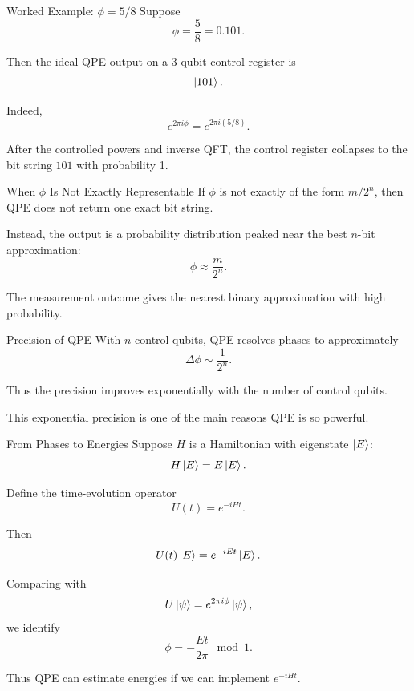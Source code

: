 \documentclass{beamer}
\begin{document}
\begin{frame}{Worked Example: \(\phi=5/8\)}
Suppose
\[
\phi = \frac{5}{8} = 0.101.
\]

Then the ideal QPE output on a 3-qubit control register is
\[
\ket{101}.
\]

Indeed,
\[
e^{2\pi i \phi} = e^{2\pi i (5/8)}.
\]

After the controlled powers and inverse QFT, the control register collapses to the bit string \(101\) with probability 1.
\end{frame}

\begin{frame}{When \(\phi\) Is Not Exactly Representable}
If \(\phi\) is not exactly of the form \(m/2^n\), then QPE does not return one exact bit string.

Instead, the output is a probability distribution peaked near the best \(n\)-bit approximation:
\[
\phi \approx \frac{m}{2^n}.
\]

The measurement outcome gives the nearest binary approximation with high probability.
\end{frame}

\begin{frame}{Precision of QPE}
With \(n\) control qubits, QPE resolves phases to approximately
\[
\Delta \phi \sim \frac{1}{2^n}.
\]

Thus the precision improves exponentially with the number of control qubits.

This exponential precision is one of the main reasons QPE is so powerful.
\end{frame}

\begin{frame}{From Phases to Energies}
Suppose \(H\) is a Hamiltonian with eigenstate \(\ket{E}\):
\[
H\ket{E} = E\ket{E}.
\]

Define the time-evolution operator
\[
U(t)=e^{-iHt}.
\]

Then
\[
U(t)\ket{E} = e^{-iEt}\ket{E}.
\]

Comparing with
\[
U\ket{\psi}=e^{2\pi i \phi}\ket{\psi},
\]
we identify
\[
\phi = -\frac{Et}{2\pi} \mod 1.
\]

Thus QPE can estimate energies if we can implement \(e^{-iHt}\).
\end{frame}
\end{document}
